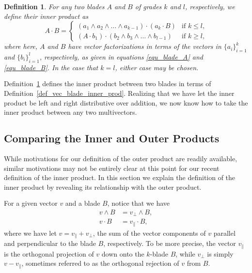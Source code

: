 \documentclass[12pt]{article}
\numberwithin{equation}{section}
\newtheorem{definition}{Definition}[section]
\begin{document}
\begin{definition}\label{def_blade_blade_inner_prod}
For any two blades $A$ and $B$ of grades $k$ and $l$, respectively,
we define their inner product as
\begin{equation}
A\cdot B = \left\{
\begin{array}{ll}
(a_1\wedge a_2\wedge\dots\wedge a_{k-1})\cdot (a_k\cdot B) & \mbox{if $k\leq l$,} \\
(A\cdot b_1)\cdot(b_2\wedge b_3\wedge\dots\wedge b_{l-1}) & \mbox{if $k\geq l$,}
\end{array}
\right.
\end{equation}
where here, $A$ and $B$ have vector factorizations in terms of the
vectors in $\{a_i\}_{i=1}^k$ and $\{b_i\}_{i=1}^l$, respectively,
as given in equations \eqref{equ_blade_A} and \eqref{equ_blade_B}.
In the case that $k=l$, either case may be chosen.
\end{definition}
Definition~\ref{def_blade_blade_inner_prod} defines the
inner product between two blades in terms of Definition~\ref{def_vec_blade_inner_prod}.
Realizing that we have let the inner product be left and right distributive
over addition, we now know how to take the inner product between
any two multivectors.

\subsection{Comparing the Inner and Outer Products}

While motivations for our definition of the outer product are readily available,
similar motivations may not be entirely clear at this point for our recent
definition of the inner product.  In this section we explain the
definition of the inner product by revealing its relationship with
the outer product.

For a given vector $v$ and a blade $B$, notice
that we have
\begin{align}
v\wedge B &= v_{\perp}\wedge B, \label{equ_v_op_B}\\
v\cdot B &= v_{\parallel}\cdot B,\label{equ_v_ip_B}
\end{align}
where we have let $v=v_{\parallel}+v_{\perp}$, the
sum of the vector components of $v$ parallel and
perpendicular to the blade $B$, respectively.  To be more precise,
the vector $v_{\parallel}$ is the orthogonal projection of $v$ down
onto the $k$-blade $B$, while $v_{\perp}$ is simply $v-v_{\parallel}$,
sometimes referred to as the orthogonal rejection of $v$ from $B$.
\end{document}
